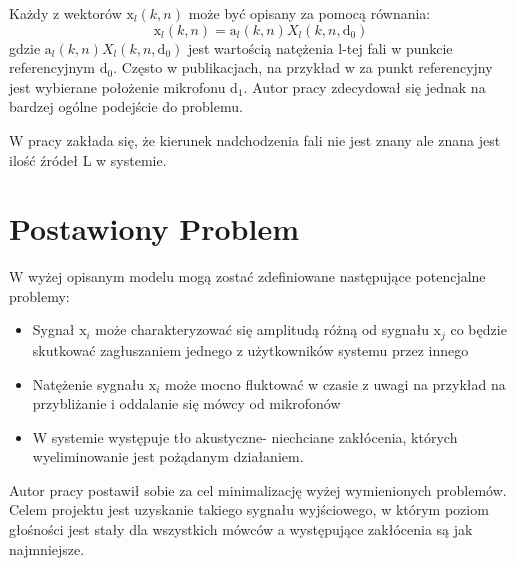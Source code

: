 \noindent Każdy z wektorów $\bm{\mathrm{x}}_l(k,n)$ może być opisany za pomocą równania:
\begin{equation}
    \label{equation:2.3}
    \bm{\mathrm{x}}_l(k,n)=
    \bm{\mathrm{a}}_l(k,n)X_{l}(k,n,\bm{\mathrm{d}}_{0})
\end{equation}
\noindent gdzie $\bm{\mathrm{a}}_l(k,n)X_{l}(k,n,\bm{\mathrm{d}}_{0})$ jest wartością natężenia l-tej fali w punkcie referencyjnym $\bm{\mathrm{d}}_0$. Często w publikacjach, na przykład w \cite{Braun2014} za punkt referencyjny jest wybierane położenie mikrofonu $\bm{\mathrm{d}}_1$. Autor pracy zdecydował się jednak na bardzej ogólne podejście do problemu.

\noindent W pracy zakłada się, że kierunek nadchodzenia fali nie jest znany ale znana jest ilość źródeł L w systemie.


\newpage
\section{Postawiony Problem}

W wyżej opisanym modelu mogą zostać zdefiniowane następujące potencjalne problemy:
\begin{itemize}
    \item Sygnał $\bm{\mathrm{x}}_{i}$ może charakteryzować się amplitudą różną od sygnału $\bm{\mathrm{x}}_{j}$ co będzie skutkować zagłuszaniem jednego z użytkowników systemu przez innego 
    \item Natężenie sygnału $\bm{\mathrm{x}}_{i}$ może mocno fluktować w czasie z uwagi na przykład na przybliżanie i oddalanie się mówcy od mikrofonów
    \item W systemie występuje tło akustyczne- niechciane zakłócenia, których wyeliminowanie jest pożądanym działaniem.
\end{itemize}

\noindent Autor pracy postawił sobie za cel minimalizację wyżej wymienionych problemów. Celem projektu jest uzyskanie takiego sygnału wyjściowego, w którym poziom głośności jest stały dla wszystkich mówców a występujące zakłócenia są jak najmniejsze.